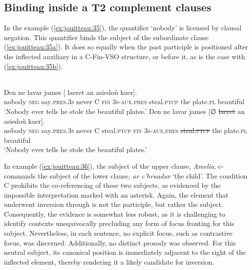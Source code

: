 \documentclass[output=paper,colorlinks,citecolor=brown]{langscibook}
\begin{document}
\subsection{Binding inside a T2 complement clauses}

In the example (\ref{ex:jouitteau:35}), the quantifier ‘nobody’ is licensed by clausal negation. This quantifier binds the subject of the subordinate clause (\ref{ex:jouitteau:35a}). It does so equally when the past participle is positioned after the inflected auxiliary in a C-Fin-VSO structure, or before it, as is the case with  (\ref{ex:jouitteau:35b}). 

\newpage
\ea \label{ex:jouitteau:35} \\
\ea \label{ex:jouitteau:35a}
\gll Den     ne   lavar james  [\FirstPosition{\BoldNull}   {}    {}  laeret   an  asiedoù kaer]. \\
nobody \textsc{neg} say\textsc{.pres.3s}   never C \textsc{fin} \textsc{3s-aux.pres}  steal\textsc{.ptcp}  the  plate\textsc{.pl}  beautiful \\
\glt ‘Nobody ever tells he stole the beautiful plates.’ 
\ex \label{ex:jouitteau:35b}
\gll Den     ne   lavar james  [∅     {}    {}   \sout{laeret}         an  asiedoù kaer]. \\
nobody \textsc{neg} say\textsc{.pres.3s}   never C steal\textsc{.ptcp} \textsc{fin} \textsc{3s-aux.pres}  \sout{steal\textsc{.ptcp}}  the plate\textsc{.pl} beautiful \\
\glt ‘Nobody ever tells he stole the beautiful plates.’ \\
\z
\z


In example (\ref{ex:jouitteau:36}), the subject of the upper clause, \textit{Amelia}, c-commands the subject of the lower clause, \textit{ar c’hruadur} ‘the child’. The condition C prohibits the co-referencing of these two subjects, as evidenced by the impossible interpretation marked with an asterisk. Again, the element that underwent inversion through  is not the participle, but rather the subject. Consequently, the evidence is somewhat less robust, as it is challenging to identify contexts unequivocally precluding any form of focus fronting for this subject. Nevertheless, in each sentence, no explicit focus, such as contrastive focus, was discerned. Additionally, no distinct prosody was observed. For this neutral subject, its canonical position is immediately adjacent to the right of the inflected element, thereby rendering it a likely candidate for inversion. 
\end{document}
